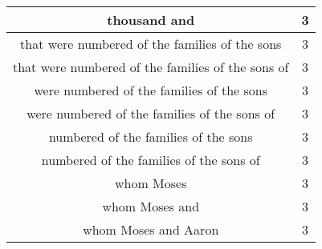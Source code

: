 \begin{center}
\begin{longtable}{|c|c|}
thousand and & 3\\ \hline 
that were numbered of the families of the sons & 3\\ \hline 
that were numbered of the families of the sons of & 3\\ \hline 
were numbered of the families of the sons & 3\\ \hline 
were numbered of the families of the sons of & 3\\ \hline 
numbered of the families of the sons & 3\\ \hline 
numbered of the families of the sons of & 3\\ \hline 
whom Moses & 3\\ \hline 
whom Moses and & 3\\ \hline 
whom Moses and Aaron & 3\\ \hline 
\end{longtable}
\end{center}





